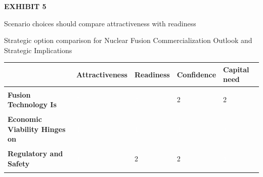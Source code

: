 \documentclass[10pt,a4paper]{article}
\begin{document}
\clearpage
{\textcolor{BOGreen}{\scriptsize\bfseries EXHIBIT 5}}\par\vspace{4pt}
{\sffamily\fontsize{17}{21}\selectfont\color{BONavy} Scenario choices should compare attractiveness with readiness}\par
{\small\color{BOText} Strategic option comparison for Nuclear Fusion Commercialization Outlook and Strategic Implications}\par\vspace{6pt}
{\scriptsize\begin{tabular}{p{38mm}>{\centering\arraybackslash}p{21mm}>{\centering\arraybackslash}p{21mm}>{\centering\arraybackslash}p{21mm}>{\centering\arraybackslash}p{21mm}}
 & {\bfseries Attractiveness} & {\bfseries Readiness} & {\bfseries Confidence} & {\bfseries Capital need} \\
\hline
{\bfseries Fusion Technology Is} & \colorbox{BOGreen}{\textcolor{white}{\strut\hspace{5pt}5\hspace{5pt}}} & \colorbox{BOBlue}{\textcolor{white}{\strut\hspace{5pt}3\hspace{5pt}}} & \colorbox{BOLight}{\textcolor{BOText}{\strut\hspace{5pt}2\hspace{5pt}}} & \colorbox{BOLight}{\textcolor{BOText}{\strut\hspace{5pt}2\hspace{5pt}}} \\
{\bfseries Economic Viability Hinges on} & \colorbox{BOGreen}{\textcolor{white}{\strut\hspace{5pt}4\hspace{5pt}}} & \colorbox{BOGreen}{\textcolor{white}{\strut\hspace{5pt}4\hspace{5pt}}} & \colorbox{BOBlue}{\textcolor{white}{\strut\hspace{5pt}3\hspace{5pt}}} & \colorbox{BOBlue}{\textcolor{white}{\strut\hspace{5pt}3\hspace{5pt}}} \\
{\bfseries Regulatory and Safety} & \colorbox{BOGreen}{\textcolor{white}{\strut\hspace{5pt}4\hspace{5pt}}} & \colorbox{BOLight}{\textcolor{BOText}{\strut\hspace{5pt}2\hspace{5pt}}} & \colorbox{BOLight}{\textcolor{BOText}{\strut\hspace{5pt}2\hspace{5pt}}} & \colorbox{BOGreen}{\textcolor{white}{\strut\hspace{5pt}4\hspace{5pt}}} \\

\end{tabular}}
\end{document}
